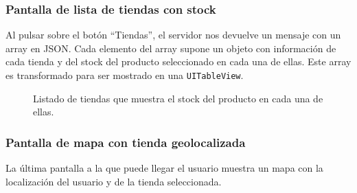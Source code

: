\subsubsection{Pantalla de lista de tiendas con stock}
Al pulsar sobre el botón ``Tiendas'', el servidor nos devuelve un mensaje con un array en JSON. Cada elemento del array supone un objeto con información de cada tienda y del stock del producto seleccionado en cada una de ellas. Este array es transformado para ser mostrado en una \texttt{UITableView}.

\begin{figure}[H]
	\centering
	\caption{Listado de tiendas que muestra el stock del producto en cada una de ellas.}
	\label{fig:listaTiendas}
\end{figure}

\subsubsection{Pantalla de mapa con tienda geolocalizada}
La última pantalla a la que puede llegar el usuario muestra un mapa con la localización del usuario y de la tienda seleccionada.

